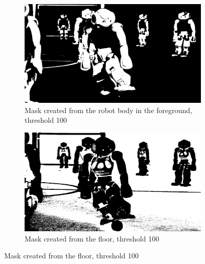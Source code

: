 \documentclass{article}
\begin{document}
\begin{figure}[H]
	\begin{subfigure}{0.4\textwidth}
		\includegraphics[width=\textwidth]{robocup_maskBGR100robot.jpg}
		\caption{Mask created from the robot body in the foreground, threshold 100}
		\label{fig:maskBGR100robot}
	\end{subfigure}
	\hfill
	\begin{subfigure}{0.4\textwidth}
		\includegraphics[width=\textwidth]{robocup_maskBGR100floor.jpg}
		\caption{Mask created from the floor, threshold 100}
		\label{fig:maskBGR100floor}
	\end{subfigure}


\end{figure}
\end{document}
